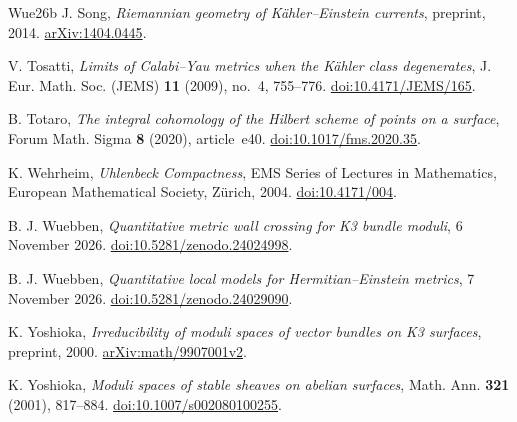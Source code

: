 \begin{thebibliography}{Wue26b}
J. Song,
\emph{Riemannian geometry of K\"ahler--Einstein currents},
preprint, 2014.
\href{https://arxiv.org/abs/1404.0445}{arXiv:1404.0445}.

V. Tosatti,
\emph{Limits of Calabi--Yau metrics when the K\"ahler class degenerates},
J. Eur. Math. Soc. (JEMS) \textbf{11} (2009), no.~4, 755--776.
\href{https://doi.org/10.4171/JEMS/165}{doi:10.4171/JEMS/165}.

B. Totaro,
\emph{The integral cohomology of the Hilbert scheme of points on a surface},
Forum Math. Sigma \textbf{8} (2020), article~e40.
\href{https://doi.org/10.1017/fms.2020.35}{doi:10.1017/fms.2020.35}.

K. Wehrheim,
\emph{Uhlenbeck Compactness}, EMS Series of Lectures in Mathematics,
European Mathematical Society, Z\"urich, 2004.
\href{https://doi.org/10.4171/004}{doi:10.4171/004}.

B. J. Wuebben,
\emph{Quantitative metric wall crossing for K3 bundle moduli},
6 November 2026.
\href{https://doi.org/10.5281/zenodo.24024998}{doi:10.5281/zenodo.24024998}.

B. J. Wuebben,
\emph{Quantitative local models for Hermitian--Einstein metrics},
7 November 2026.
\href{https://doi.org/10.5281/zenodo.24029090}{doi:10.5281/zenodo.24029090}.

K. Yoshioka,
\emph{Irreducibility of moduli spaces of vector bundles on K3 surfaces},
preprint, 2000.
\href{https://arxiv.org/abs/math/9907001v2}{arXiv:math/9907001v2}.

K. Yoshioka,
\emph{Moduli spaces of stable sheaves on abelian surfaces},
Math. Ann. \textbf{321} (2001), 817--884.
\href{https://doi.org/10.1007/s002080100255}{doi:10.1007/s002080100255}.

\end{thebibliography}
